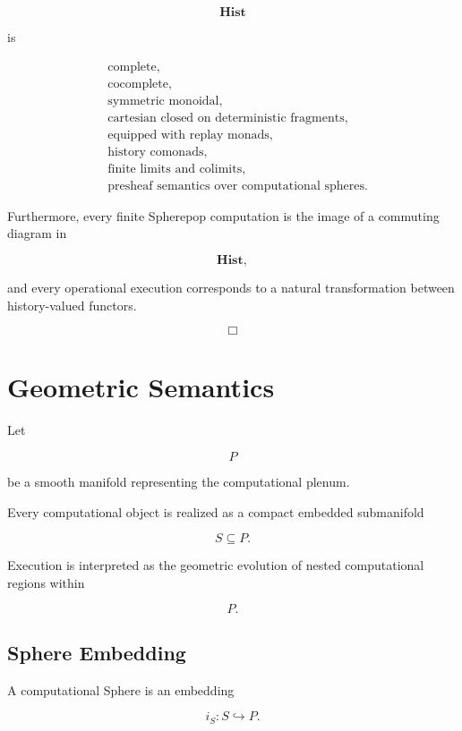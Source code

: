 \documentclass[12pt,oneside]{article}
\theoremstyle{definition}
\theoremstyle{remark}
\begin{document}
\[
\mathbf{Hist}
\]

is

\[
\boxed{
\begin{aligned}
&\text{complete},\\
&\text{cocomplete},\\
&\text{symmetric monoidal},\\
&\text{cartesian closed on deterministic fragments},\\
&\text{equipped with replay monads},\\
&\text{history comonads},\\
&\text{finite limits and colimits},\\
&\text{presheaf semantics over computational spheres}.
\end{aligned}
}
\]

Furthermore, every finite Spherepop computation is the image of a commuting
diagram in

\[
\mathbf{Hist},
\]

and every operational execution corresponds to a natural transformation
between history-valued functors.

\[
\Box
\]

\section{Geometric Semantics}

Let

\[
P
\]

be a smooth manifold representing the computational plenum.

Every computational object is realized as a compact embedded submanifold

\[
S
\subseteq
P.
\]

Execution is interpreted as the geometric evolution of nested computational
regions within

\[
P.
\]

\subsection*{Sphere Embedding}

A computational Sphere is an embedding

\[
i_S
:
S
\hookrightarrow
P.
\]
\end{document}
